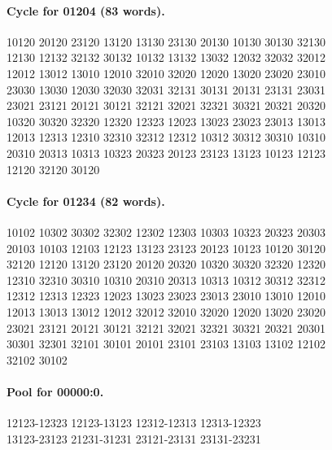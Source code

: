 \documentclass[11pt]{article}
\theoremstyle{remark}
\numberwithin{equation}{section}
\begin{document}
\paragraph{Cycle for 01204 (83 words).}
\begingroup\footnotesize\ttfamily\begin{flushleft}
10120 20120 23120 13120 13130 23130 20130 10130 30130 32130\\
12130 12132 32132 30132 10132 13132 13032 12032 32032 32012\\
12012 13012 13010 12010 32010 32020 12020 13020 23020 23010\\
23030 13030 12030 32030 32031 32131 30131 20131 23131 23031\\
23021 23121 20121 30121 32121 32021 32321 30321 20321 20320\\
10320 30320 32320 12320 12323 12023 13023 23023 23013 13013\\
12013 12313 12310 32310 32312 12312 10312 30312 30310 10310\\
20310 20313 10313 10323 20323 20123 23123 13123 10123 12123\\
12120 32120 30120\\
\end{flushleft}\endgroup
\paragraph{Cycle for 01234 (82 words).}
\begingroup\footnotesize\ttfamily\begin{flushleft}
10102 10302 30302 32302 12302 12303 10303 10323 20323 20303\\
20103 10103 12103 12123 13123 23123 20123 10123 10120 30120\\
32120 12120 13120 23120 20120 20320 10320 30320 32320 12320\\
12310 32310 30310 10310 20310 20313 10313 10312 30312 32312\\
12312 12313 12323 12023 13023 23023 23013 23010 13010 12010\\
12013 13013 13012 12012 32012 32010 32020 12020 13020 23020\\
23021 23121 20121 30121 32121 32021 32321 30321 20321 20301\\
30301 32301 32101 30101 20101 23101 23103 13103 13102 12102\\
32102 30102\\
\end{flushleft}\endgroup
\paragraph{Pool for 00000:0.}
\begingroup\footnotesize\ttfamily\begin{flushleft}
12123-12323 12123-13123 12312-12313 12313-12323\\
13123-23123 21231-31231 23121-23131 23131-23231\\
\end{flushleft}\endgroup
\end{document}
